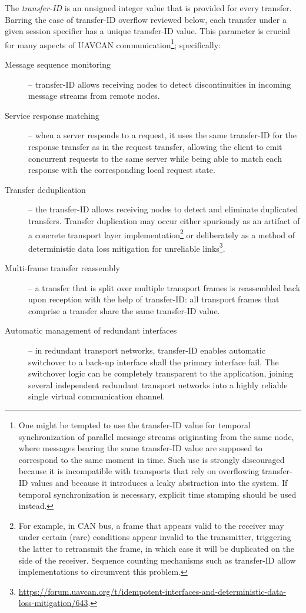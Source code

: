 The \emph{transfer-ID} is an unsigned integer value that is provided for every transfer.
Barring the case of transfer-ID overflow reviewed below,
each transfer under a given session specifier has a unique transfer-ID value.
This parameter is crucial for many aspects of UAVCAN communication\footnote{%
    One might be tempted to use the transfer-ID value for temporal synchronization of
    parallel message streams originating from the same node,
    where messages bearing the same transfer-ID value are supposed to correspond to the same moment in time.
    Such use is strongly discouraged because it is incompatible with transports that rely on overflowing
    transfer-ID values and because it introduces a leaky abstraction into the system.
    If temporal synchronization is necessary, explicit time stamping should be used instead.
}; specifically:

\begin{description}
    \item[Message sequence monitoring] -- transfer-ID allows receiving nodes to detect discontinuities
    in incoming message streams from remote nodes.

    \item[Service response matching] -- when a server responds to a request, it uses the same transfer-ID for the
    response transfer as in the request transfer,
    allowing the client to emit concurrent requests to the same server while being able to
    match each response with the corresponding local request state.

    \item[Transfer deduplication] -- the transfer-ID allows receiving nodes to detect and eliminate duplicated
    transfers.
    Transfer duplication may occur either spuriously as an artifact of a concrete
    transport layer implementation\footnote{%
        For example, in CAN bus, a frame that appears valid to the receiver may under certain (rare) conditions
        appear invalid to the transmitter, triggering the latter to retransmit the frame,
        in which case it will be duplicated on the side of the receiver.
        Sequence counting mechanisms such as transfer-ID allow implementations to circumvent this problem.
    } or deliberately as a method of deterministic data loss mitigation for unreliable links\footnote{%
        \url{https://forum.uavcan.org/t/idempotent-interfaces-and-deterministic-data-loss-mitigation/643}.
    }.

    \item[Multi-frame transfer reassembly] -- a transfer that is split over multiple transport frames is reassembled
    back upon reception with the help of transfer-ID: all transport frames that comprise a transfer
    share the same transfer-ID value.

    \item[Automatic management of redundant interfaces] -- in redundant transport networks,
    transfer-ID enables automatic switchover to a back-up interface shall the primary interface fail.
    The switchover logic can be completely transparent to the application, joining several independent
    redundant transport networks into a highly reliable single virtual communication channel.
\end{description}

